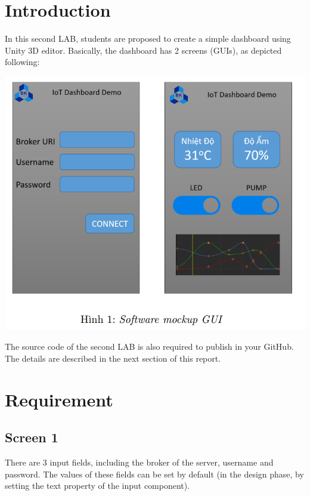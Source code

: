 \documentclass[a4paper,11pt]{article}
\theoremstyle{mytheor}
\begin{document}
\renewcommand{\contentsname}{Content}
\newpage
\vspace{1cm}
\tableofcontents
\newpage

\section{Introduction}

In this second LAB, students are proposed to create a simple dashboard using Unity 3D editor.
Basically, the dashboard has 2 screens (GUIs), as depicted following:

\begin{center}
    \includegraphics[width=1\textwidth]{Pic1.png}\\
\end{center}

The source code of the second LAB is also required to publish in your GitHub. The details
are described in the next section of this report.

\section{Requirement}

\subsection{Screen 1}

There are 3 input fields, including the broker of the server, username and password. The values of these fields can be set by default (in the design phase, by setting the text property of the input component).\\
\end{document}
